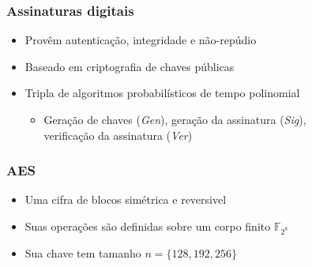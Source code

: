 \documentclass[12pt]{beamer}
\newcommand{\concat}{\, \vert \vert \,}
\newcommand{\hash}[2][]{\mathcal{H}^{#1}(#2)}
\begin{document}
\begin{frame}
  \frametitle{Assinaturas digitais}
  \begin{itemize}
    \item Provêm autenticação, integridade e não-repúdio
    \item Baseado em criptografia de chaves públicas
    \item Tripla de algoritmos probabilísticos de tempo polinomial
      \cite{Goldreich:2004:FCV:975541}
    \begin{itemize}
      \item Geração de chaves (\emph{Gen}), geração da assinatura (\emph{Sig}),\\
          verificação da assinatura (\emph{Ver})
    \end{itemize}
  \end{itemize}

    \begin{figure}[h]
      \centering
    \end{figure}
\end{frame}

\begin{frame}
    \frametitle{AES}
    \begin{itemize}
        \item Uma cifra de blocos simétrica e reversivel
        \item Suas operações são definidas sobre um corpo finito
        $\mathbb{F}_{2^{8}}$
        \item Sua chave tem tamanho $n = \{128,192,256 \}$
    \end{itemize}
    
\end{frame}
\end{document}
